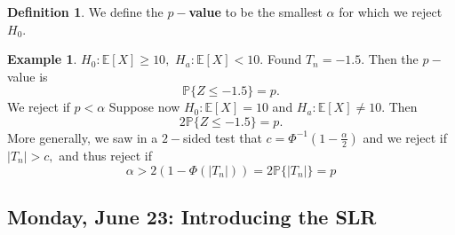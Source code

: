 \documentclass[10pt, oneside]{article}
\newcommand{\bbP}{\mathbb{P}}
\newcommand{\bbE}{\mathbb{E}}
\theoremstyle{definition}
\newtheorem{exmp}{Example}[section]
\newtheorem{defn}{Definition}
\begin{document}
\begin{defn}
    We define the \textbf{$p-$value} to be the smallest $\alpha$ for which we reject $H_0.$
\end{defn}
\begin{exmp}
    $H_0: \bbE[X] \geq 10,$ $H_a: \bbE[X] < 10.$ Found $T_n = -1.5.$ Then the $p-$value is 
    \[\bbP\{Z \leq -1.5\} = p.\] We reject if $p<\alpha$ Suppose now $H_0: \bbE[X] = 10$ and $H_a: \bbE[X]\neq 10.$ Then 
    \[2\bbP\{Z \leq -1.5\} = p.\] More generally, we saw in a $2-$sided test that $c = \Phi^{-1}(1 - \frac{\alpha}{2})$ and we reject if $|T_n| >c,$ and thus reject if
    \[\alpha > 2 (1 - \Phi(|T_n|)) = 2\bbP\{|T_n|\} = p\]
\end{exmp}


\newpage
\subsection{Monday, June 23: Introducing the SLR}
\end{document}
